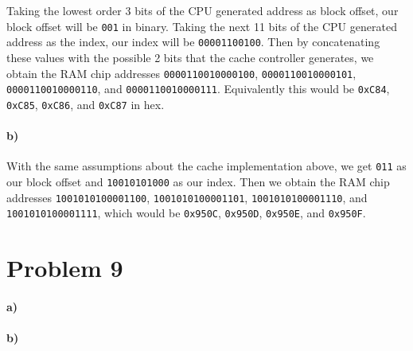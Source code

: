 \documentclass[12pt]{article}
\begin{document}
Taking the lowest order 3 bits of the CPU generated address as block offset, our block offset will be \texttt{001} in binary. Taking the next 11 bits
of the CPU generated address as the index, our index will be \texttt{00001100100}. Then by concatenating these values with the possible 2 bits that the cache
controller generates, we obtain the RAM chip addresses \texttt{0000110010000100}, \texttt{0000110010000101}, \texttt{0000110010000110},
and \texttt{0000110010000111}. Equivalently this would be \texttt{0xC84}, \texttt{0xC85}, \texttt{0xC86}, and \texttt{0xC87} in hex.

\paragraph{b)}

With the same assumptions about the cache implementation above, we get \texttt{011} as our block offset and \texttt{10010101000} as our index.
Then we obtain the RAM chip addresses \texttt{1001010100001100}, \texttt{1001010100001101}, \texttt{1001010100001110}, and \texttt{1001010100001111},
which would be \texttt{0x950C}, \texttt{0x950D}, \texttt{0x950E}, and \texttt{0x950F}.

\section*{Problem 9}

\paragraph{a)}

\paragraph{b)}
\end{document}
